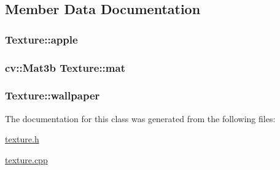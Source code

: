 \subsection{Member Data Documentation}
\subsubsection[{\texorpdfstring{apple}{apple}}]{ Texture\+::apple\hspace{0.3cm}{\ttfamily [static]}}\hypertarget{classTexture_ae94748846788a55df372cc9152f829dd}{}\label{classTexture_ae94748846788a55df372cc9152f829dd}
\subsubsection[{\texorpdfstring{mat}{mat}}]{\setlength{\rightskip}{0pt plus 5cm}cv\+::\+Mat3b Texture\+::mat\hspace{0.3cm}{\ttfamily [private]}}\hypertarget{classTexture_a5d776b17260e556ee5bd94cbbd412413}{}\label{classTexture_a5d776b17260e556ee5bd94cbbd412413}
\subsubsection[{\texorpdfstring{wallpaper}{wallpaper}}]{ Texture\+::wallpaper\hspace{0.3cm}{\ttfamily [static]}}\hypertarget{classTexture_a1fe6c8c86fe00b7f58d874c136b632ba}{}\label{classTexture_a1fe6c8c86fe00b7f58d874c136b632ba}


The documentation for this class was generated from the following files\+:\begin{DoxyCompactItemize}
\item 
\hyperlink{texture_8h}{texture.\+h}\item 
\hyperlink{texture_8cpp}{texture.\+cpp}\end{DoxyCompactItemize}
